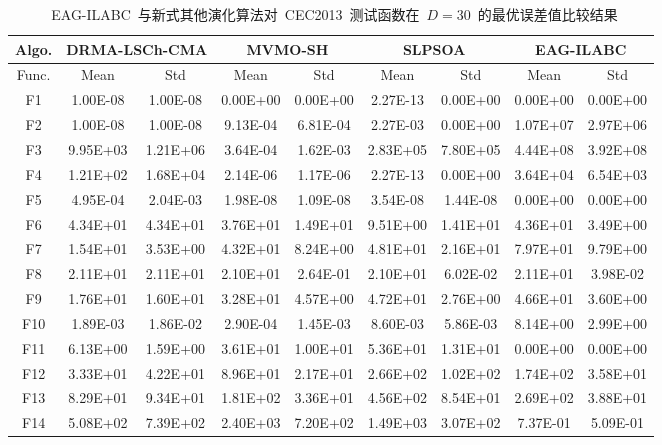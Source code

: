 \begin{table*}[htbp]
  \centering
  \caption{~EAG-ILABC~与新式其他演化算法对~CEC2013~测试函数在~$D=30$~的最优误差值比较结果}
  \scriptsize
    \begin{tabular}{|c|cc|cc|cc|cc|}
    \hline
    Algo. & \multicolumn{2}{c|}{DRMA-LSCh-CMA} & \multicolumn{2}{c|}{MVMO-SH} & \multicolumn{2}{c|}{SLPSOA} & \multicolumn{2}{c|}{EAG-ILABC} \\
    \hline
    Func. & Mean  & Std   & Mean  & Std   & Mean  & Std   & Mean & Std \\ \hline
    F1    & 1.00E-08 & 1.00E-08 & 0.00E+00 & 0.00E+00 & 2.27E-13 & 0.00E+00 & 0.00E+00 & 0.00E+00 \\
    F2    & 1.00E-08 & 1.00E-08 & 9.13E-04 & 6.81E-04 & 2.27E-03 & 0.00E+00 & 1.07E+07 & 2.97E+06 \\
    F3    & 9.95E+03 & 1.21E+06 & 3.64E-04 & 1.62E-03 & 2.83E+05 & 7.80E+05 & 4.44E+08 & 3.92E+08 \\
    F4    & 1.21E+02 & 1.68E+04 & 2.14E-06 & 1.17E-06 & 2.27E-13 & 0.00E+00 & 3.64E+04 & 6.54E+03 \\
    F5    & 4.95E-04 & 2.04E-03 & 1.98E-08 & 1.09E-08 & 3.54E-08 & 1.44E-08 & 0.00E+00 & 0.00E+00 \\
    \hline
    F6    & 4.34E+01 & 4.34E+01 & 3.76E+01 & 1.49E+01 & 9.51E+00 & 1.41E+01 & 4.36E+01 & 3.49E+00 \\
    F7    & 1.54E+01 & 3.53E+00 & 4.32E+01 & 8.24E+00 & 4.81E+01 & 2.16E+01 & 7.97E+01 & 9.79E+00 \\
    F8    & 2.11E+01 & 2.11E+01 & 2.10E+01 & 2.64E-01 & 2.10E+01 & 6.02E-02 & 2.11E+01 & 3.98E-02 \\
    F9    & 1.76E+01 & 1.60E+01 & 3.28E+01 & 4.57E+00 & 4.72E+01 & 2.76E+00 & 4.66E+01 & 3.60E+00 \\
    F10   & 1.89E-03 & 1.86E-02 & 2.90E-04 & 1.45E-03 & 8.60E-03 & 5.86E-03 & 8.14E+00 & 2.99E+00 \\
    F11   & 6.13E+00 & 1.59E+00 & 3.61E+01 & 1.00E+01 & 5.36E+01 & 1.31E+01 & 0.00E+00 & 0.00E+00 \\
    F12   & 3.33E+01 & 4.22E+01 & 8.96E+01 & 2.17E+01 & 2.66E+02 & 1.02E+02 & 1.74E+02 & 3.58E+01 \\
    F13   & 8.29E+01 & 9.34E+01 & 1.81E+02 & 3.36E+01 & 4.56E+02 & 8.54E+01 & 2.69E+02 & 3.88E+01 \\
    F14   & 5.08E+02 & 7.39E+02 & 2.40E+03 & 7.20E+02 & 1.49E+03 & 3.07E+02 & 7.37E-01 & 5.09E-01 \\

\end{tabular}
\end{table*}
